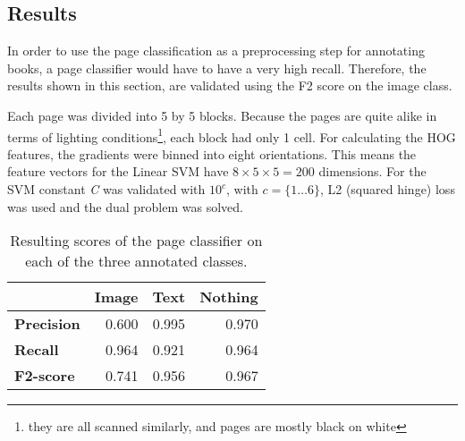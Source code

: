 \subsection{Results}
\label{subsec:pageclasresults}

In order to use the page classification as a preprocessing step for annotating
books, a page classifier would have to have a very high recall. Therefore, the
results shown in this section, are validated using the F2 score on the image
class. 

Each page was divided into 5 by 5 blocks. Because the pages
are quite alike in terms of lighting conditions\footnote{they are all scanned
similarly, and pages are mostly black on white}, each block had only 1 cell. For
calculating the HOG features, the gradients were binned into eight orientations.
This means the feature vectors for the Linear SVM have $8 \times 5 \times 5 =
200$ dimensions. 
For the SVM constant \emph{C} was validated with $10^c$, with $c = \{1 \dots
6\}$, L2 (squared hinge) loss was used and the dual problem was solved. 

\begin{table}
\centering
\begin{tabular}{l r r r}
\hline
  & \textbf{Image} & \textbf{Text} & \textbf{Nothing} \\\hline
\textbf{Precision} & 0.600  & 0.995 & 0.970 \\
\textbf{Recall} & 0.964  & 0.921 & 0.964 \\
\textbf{F2-score} & 0.741 & 0.956 & 0.967 \\\hline
\end{tabular}
\caption{Resulting scores of the page classifier on each of the three annotated
classes.}
\label{tab:pageclasresults}
\end{table}


